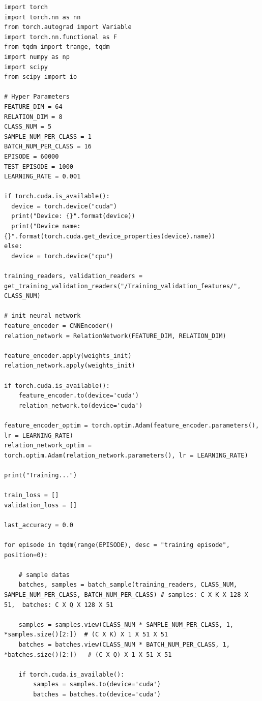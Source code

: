 \documentclass[12pt,a4paper,titlepage]{article}
\begin{document}
\begin{lstlisting}[language=iPython,firstnumber=1, caption=relation\_training.py, label=relation training,captionpos=b]
import torch
import torch.nn as nn
from torch.autograd import Variable
import torch.nn.functional as F
from tqdm import trange, tqdm
import numpy as np
import scipy
from scipy import io

# Hyper Parameters
FEATURE_DIM = 64
RELATION_DIM = 8
CLASS_NUM = 5
SAMPLE_NUM_PER_CLASS = 1
BATCH_NUM_PER_CLASS = 16
EPISODE = 60000
TEST_EPISODE = 1000
LEARNING_RATE = 0.001

if torch.cuda.is_available():
  device = torch.device("cuda")
  print("Device: {}".format(device))
  print("Device name: {}".format(torch.cuda.get_device_properties(device).name))
else:
  device = torch.device("cpu")

training_readers, validation_readers = get_training_validation_readers("/Training_validation_features/", CLASS_NUM)

# init neural network
feature_encoder = CNNEncoder()
relation_network = RelationNetwork(FEATURE_DIM, RELATION_DIM)

feature_encoder.apply(weights_init)
relation_network.apply(weights_init)

if torch.cuda.is_available():
    feature_encoder.to(device='cuda')
    relation_network.to(device='cuda')

feature_encoder_optim = torch.optim.Adam(feature_encoder.parameters(), lr = LEARNING_RATE)
relation_network_optim = torch.optim.Adam(relation_network.parameters(), lr = LEARNING_RATE)

print("Training...")

train_loss = []
validation_loss = []

last_accuracy = 0.0

for episode in tqdm(range(EPISODE), desc = "training episode", position=0):

    # sample datas
    batches, samples = batch_sample(training_readers, CLASS_NUM, SAMPLE_NUM_PER_CLASS, BATCH_NUM_PER_CLASS) # samples: C X K X 128 X 51,  batches: C X Q X 128 X 51
    
    samples = samples.view(CLASS_NUM * SAMPLE_NUM_PER_CLASS, 1, *samples.size()[2:])  # (C X K) X 1 X 51 X 51
    batches = batches.view(CLASS_NUM * BATCH_NUM_PER_CLASS, 1, *batches.size()[2:])   # (C X Q) X 1 X 51 X 51

    if torch.cuda.is_available():
        samples = samples.to(device='cuda')
        batches = batches.to(device='cuda')


\end{lstlisting}
\end{document}
